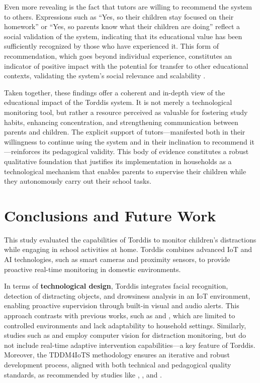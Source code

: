                 Even more revealing is the fact that tutors are willing to recommend the system to others. Expressions such as “Yes, so their children stay focused on their homework” or “Yes, so parents know what their children are doing” reflect a social validation of the system, indicating that its educational value has been sufficiently recognized by those who have experienced it. This form of recommendation, which goes beyond individual experience, constitutes an indicator of positive impact with the potential for transfer to other educational contexts, validating the system’s social relevance and scalability \citep{Panadero2017Review}.
                
                Taken together, these findings offer a coherent and in-depth view of the educational impact of the Torddis system. It is not merely a technological monitoring tool, but rather a resource perceived as valuable for fostering study habits, enhancing concentration, and strengthening communication between parents and children. The explicit support of tutors—manifested both in their willingness to continue using the system and in their inclination to recommend it—reinforces its pedagogical validity. This body of evidence constitutes a robust qualitative foundation that justifies its implementation in households as a technological mechanism that enables parents to supervise their children while they autonomously carry out their school tasks.
                
                \section{Conclusions and Future Work}
                \label{section:eight}
                This study evaluated the capabilities of Torddis to monitor children’s distractions while engaging in school activities at home. Torddis combines advanced IoT and AI technologies, such as smart cameras and proximity sensors, to provide proactive real-time monitoring in domestic environments.
                
                In terms of \textbf{technological design}, Torddis integrates facial recognition, detection of distracting objects, and drowsiness analysis in an IoT environment, enabling proactive supervision through built-in visual and audio alerts. This approach contrasts with previous works, such as \cite{Campbell2015Using} and \cite{Ucar2022Recognizing}, which are limited to controlled environments and lack adaptability to household settings. Similarly, studies such as \cite{Argel2023Intellitell} and \cite{Nguyen2019} employ computer vision for distraction monitoring, but do not include real-time adaptive intervention capabilities—a key feature of Torddis. Moreover, the TDDM4IoTS methodology ensures an iterative and robust development process, aligned with both technical and pedagogical quality standards, as recommended by studies like \cite{Erazo2016Easing}, \cite{Hachad2020}, and \cite{Salter2014Exploring}.
                
